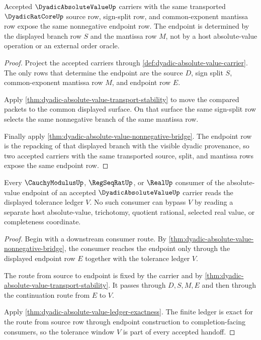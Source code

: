 \begin{theorem}
\label{thm:dyadic-absolute-value-endpoint-determinacy}
Accepted $\DyadicAbsoluteValueUp$ carriers with the same transported $\DyadicRatCoreUp$ source row, sign-split row, and common-exponent mantissa row expose the same nonnegative endpoint row. The endpoint is determined by the displayed branch row $S$ and the mantissa row $M$, not by a host absolute-value operation or an external order oracle.
\end{theorem}
\begin{proof}
Project the accepted carriers through \autoref{def:dyadic-absolute-value-carrier}. The only rows that determine the endpoint are the source $D$, sign split $S$, common-exponent mantissa row $M$, and endpoint row $E$.

Apply \autoref{thm:dyadic-absolute-value-transport-stability} to move the compared packets to the common displayed surface. On that surface the same sign-split row selects the same nonnegative branch of the same mantissa row.

Finally apply \autoref{thm:dyadic-absolute-value-nonnegative-bridge}. The endpoint row is the repacking of that displayed branch with the visible dyadic provenance, so two accepted carriers with the same transported source, split, and mantissa rows expose the same endpoint row.
\end{proof}

\begin{theorem}
\label{thm:dyadic-absolute-value-tolerance-window-handoff}
Every $\CauchyModulusUp$, $\RegSeqRatUp$, or $\RealUp$ consumer of the absolute-value endpoint of an accepted $\DyadicAbsoluteValueUp$ carrier reads the displayed tolerance ledger $V$. No such consumer can bypass $V$ by reading a separate host absolute-value, trichotomy, quotient rational, selected real value, or completeness coordinate.
\end{theorem}
\begin{proof}
Begin with a downstream consumer route. By \autoref{thm:dyadic-absolute-value-nonnegative-bridge}, the consumer reaches the endpoint only through the displayed endpoint row $E$ together with the tolerance ledger $V$.

The route from source to endpoint is fixed by the carrier and by \autoref{thm:dyadic-absolute-value-transport-stability}. It passes through $D,S,M,E$ and then through the continuation route from $E$ to $V$.

Apply \autoref{thm:dyadic-absolute-value-ledger-exactness}. The finite ledger is exact for the route from source row through endpoint construction to completion-facing consumers, so the tolerance window $V$ is part of every accepted handoff.
\end{proof}

